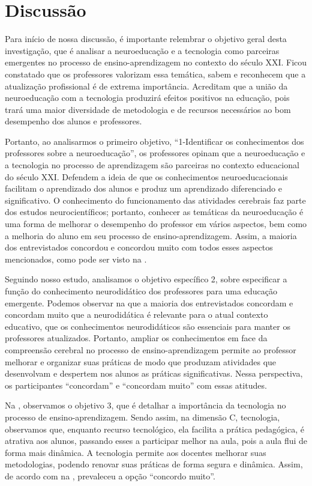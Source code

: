 \documentclass[portuguese]{textolivre}
\begin{document}
\section{Discussão}\label{sec-outras-estr}
Para início de nossa discussão, é importante relembrar o objetivo geral desta investigação, que é analisar a neuroeducação e a tecnologia como parceiras emergentes no processo de ensino-aprendizagem no contexto do século XXI. Ficou constatado que os professores valorizam essa temática, sabem e reconhecem que a atualização profissional é de extrema importância. Acreditam que a união da neuroeducação com a tecnologia produzirá efeitos positivos na educação, pois trará uma maior diversidade de metodologia e de recursos necessários ao bom desempenho dos alunos e professores. 

Portanto, ao analisarmos o primeiro objetivo, “1-Identificar os conhecimentos dos professores sobre a neuroeducação”, os professores opinam que a neuroeducação e a tecnologia no processo de aprendizagem são parceiras no contexto educacional do século XXI. Defendem a ideia de que os conhecimentos neuroeducacionais facilitam o aprendizado dos alunos e produz um aprendizado diferenciado e significativo. O conhecimento do funcionamento das atividades cerebrais faz parte dos estudos neurocientíficos; portanto, conhecer as temáticas da neuroeducação é uma forma de melhorar o desempenho do professor em vários aspectos, bem como a melhoria do aluno em seu processo de ensino-aprendizagem. Assim, a maioria dos entrevistados concordou e concordou muito com todos esses aspectos mencionados, como pode ser visto na .

Seguindo nosso estudo, analisamos o objetivo específico 2, sobre especificar a função do conhecimento neurodidático dos professores para uma educação emergente. Podemos observar na  que a maioria dos entrevistados concordam e concordam muito que a neurodidática é relevante para o atual contexto educativo, que os conhecimentos neurodidáticos são essenciais para manter os professores atualizados. Portanto, ampliar os conhecimentos em face da compreensão cerebral no processo de ensino-aprendizagem permite ao professor melhorar e organizar suas práticas de modo que produzam atividades que desenvolvam e despertem nos alunos as práticas significativas. Nessa perspectiva, os participantes “concordam” e “concordam muito” com essas atitudes.

Na , observamos o objetivo 3, que é detalhar a importância da tecnologia no processo de ensino-aprendizagem. Sendo assim, na dimensão C, tecnologia, observamos que, enquanto recurso tecnológico, ela facilita a prática pedagógica, é atrativa aos alunos, passando esses a participar melhor na aula, pois a aula flui de forma mais dinâmica. A tecnologia permite aos docentes melhorar suas metodologias, podendo renovar suas práticas de forma segura e dinâmica. Assim, de acordo com na , prevaleceu a opção “concordo muito”.
\end{document}
